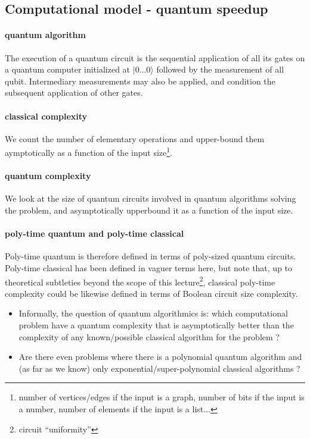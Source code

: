 \documentclass{article}
\begin{document}
\subsection{Computational model - quantum speedup}

\paragraph{quantum algorithm} The execution of a quantum circuit is the
sequential application of all its gates on a quantum computer
initialized at $|0...0\rangle$ followed by the measurement of all qubit.
Intermediary measurements may also be applied, and condition the subsequent application
of other gates. 

\paragraph{classical complexity}
We count the number of elementary operations and upper-bound them aymptotically 
as a function of the input size\footnote{number of vertices/edges if the input is a graph, 
number of bits if the input is a number, number of elements if the input is a list...}.

\paragraph{quantum complexity} We look at the size of quantum circuits involved in
quantum algorithms solving the problem, and asymptotically upperbound it as a function
of the input size.

\paragraph{poly-time quantum and poly-time classical} Poly-time quantum is therefore
defined in terms of poly-sized quantum circuits. Poly-time classical
has been defined in vaguer terms here, but note that, up to theoretical
subtleties beyond the scope of this lecture\footnote{circuit ``uniformity''
}, classical poly-time complexity could be likewise defined in terms
of Boolean circuit size complexity.

\begin{itemize}
\item Informally, the question of quantum algorithmics is: which computational problem
have a quantum complexity that is asymptotically better than the complexity
of any known/possible classical algorithm for the problem ?
\item Are there even problems where there is a polynomial quantum algorithm and (as far as we
know) only exponential/super-polynomial classical algorithms ?
\end{itemize}
\end{document}
